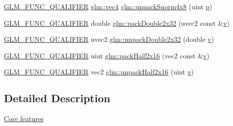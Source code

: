 \begin{DoxyCompactItemize}
\item 
\hyperlink{setup_8hpp_a33fdea6f91c5f834105f7415e2a64407}{G\+L\+M\+\_\+\+F\+U\+N\+C\+\_\+\+Q\+U\+A\+L\+I\+F\+I\+ER} \hyperlink{group__core__types_ga5881b1b022d7fd1b7218f5916532dd02}{glm\+::vec4} \hyperlink{group__core__func__packing_ga2db488646d48b7c43d3218954523fe82}{glm\+::unpack\+Snorm4x8} (uint \hyperlink{_s_d_l__opengl__glext_8h_aa5367c14d90f462230c2611b81b41d23}{p})
\item 
\hyperlink{setup_8hpp_a33fdea6f91c5f834105f7415e2a64407}{G\+L\+M\+\_\+\+F\+U\+N\+C\+\_\+\+Q\+U\+A\+L\+I\+F\+I\+ER} double \hyperlink{group__core__func__packing_gaa916ca426b2bb0343ba17e3753e245c2}{glm\+::pack\+Double2x32} (uvec2 const \&\hyperlink{_s_d_l__opengl_8h_a10a82eabcb59d2fcd74acee063775f90}{v})
\item 
\hyperlink{setup_8hpp_a33fdea6f91c5f834105f7415e2a64407}{G\+L\+M\+\_\+\+F\+U\+N\+C\+\_\+\+Q\+U\+A\+L\+I\+F\+I\+ER} uvec2 \hyperlink{group__core__func__packing_ga5f4296dc5f12f0aa67ac05b8bb322483}{glm\+::unpack\+Double2x32} (double \hyperlink{_s_d_l__opengl_8h_a10a82eabcb59d2fcd74acee063775f90}{v})
\item 
\hyperlink{setup_8hpp_a33fdea6f91c5f834105f7415e2a64407}{G\+L\+M\+\_\+\+F\+U\+N\+C\+\_\+\+Q\+U\+A\+L\+I\+F\+I\+ER} uint \hyperlink{group__core__func__packing_ga20f134b07db3a3d3a38efb2617388c92}{glm\+::pack\+Half2x16} (vec2 const \&\hyperlink{_s_d_l__opengl_8h_a10a82eabcb59d2fcd74acee063775f90}{v})
\item 
\hyperlink{setup_8hpp_a33fdea6f91c5f834105f7415e2a64407}{G\+L\+M\+\_\+\+F\+U\+N\+C\+\_\+\+Q\+U\+A\+L\+I\+F\+I\+ER} vec2 \hyperlink{group__core__func__packing_gaf59b52e6b28da9335322c4ae19b5d745}{glm\+::unpack\+Half2x16} (uint \hyperlink{_s_d_l__opengl_8h_a10a82eabcb59d2fcd74acee063775f90}{v})
\end{DoxyCompactItemize}


\subsection{Detailed Description}
\hyperlink{group__core}{Core features} 